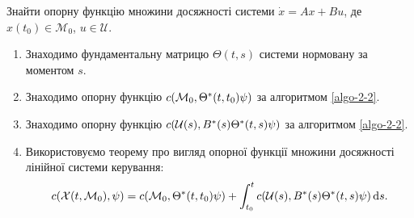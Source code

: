 \vspace*{\baselineskip}

\begin{problem*}
	Знайти опорну функцію множини досяжності системи $\dot x = A x + B u$, де $x(t_0) \in \mathcal{M}_0$, $u \in \mathcal{U}$.
\end{problem*}

\begin{algorithm}
	\label{algo-2-5}
	\begin{enumerate}
		\item Знаходимо фундаментальну матрицю $\Theta(t,s)$ системи нормовану за моментом $s$.
		\item Знаходимо опорну функцію $c(\mathcal{M}_0, \Theta^*(t, t_0) \psi)$ за алгоритмом \ref{algo-2-2}.
		\item Знаходимо опорну функцію $c(\mathcal{U}(s), B^*(s) \Theta^*(t, s) \psi)$ за алгоритмом \ref{algo-2-2}.
		\item Використовуємо теорему про вигляд опорної функції множини досяжності лінійної системи керування: 
		\begin{equation}
			\label{eq:2.8}
			c(\mathcal{X}(t, \mathcal{M}_0), \psi) = c(\mathcal{M}_0, \Theta^*(t, t_0) \psi) + \int_{t_0}^t c(\mathcal{U}(s), B^*(s) \Theta^*(t, s) \psi) \mathop{}\!\mathrm{d} s.
		\end{equation}
	\end{enumerate}
\end{algorithm}

